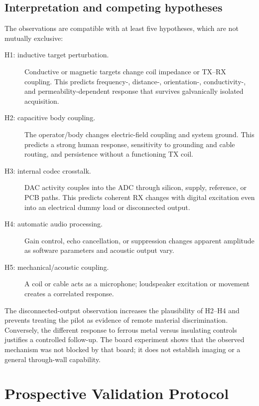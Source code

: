 \documentclass[10pt]{article}
\begin{document}
\subsection{Interpretation and competing hypotheses}
The observations are compatible with at least five hypotheses, which are not mutually exclusive:
\begin{description}
\item[H1: inductive target perturbation.] Conductive or magnetic targets change coil impedance or TX--RX coupling. This predicts frequency-, distance-, orientation-, conductivity-, and permeability-dependent response that survives galvanically isolated acquisition.
\item[H2: capacitive body coupling.] The operator/body changes electric-field coupling and system ground. This predicts a strong human response, sensitivity to grounding and cable routing, and persistence without a functioning TX coil.
\item[H3: internal codec crosstalk.] DAC activity couples into the ADC through silicon, supply, reference, or PCB paths. This predicts coherent RX changes with digital excitation even into an electrical dummy load or disconnected output.
\item[H4: automatic audio processing.] Gain control, echo cancellation, or suppression changes apparent amplitude as software parameters and acoustic output vary.
\item[H5: mechanical/acoustic coupling.] A coil or cable acts as a microphone; loudspeaker excitation or movement creates a correlated response.
\end{description}
The disconnected-output observation increases the plausibility of H2--H4 and prevents treating the pilot as evidence of remote material discrimination. Conversely, the different response to ferrous metal versus insulating controls justifies a controlled follow-up. The board experiment shows that the observed mechanism was not blocked by that board; it does not establish imaging or a general through-wall capability.

\section{Prospective Validation Protocol}
\label{sec:protocol}
\end{document}
